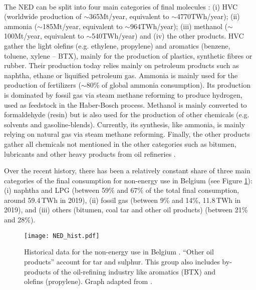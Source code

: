 \\

\noindent
The \gls{NED} can be split into four main categories of final molecules \cite{IEA2018_petrochemicals}: (i) \gls{HVC} (worldwide production of $\sim$365Mt/year, equivalent to $\sim$4770TWh/year); (ii) ammonia ($\sim$185Mt/year, equivalent to $\sim$964TWh/year); (iii) methanol ($\sim$100Mt/year, equivalent to $\sim$540TWh/year) and (iv) the other products. \Gls{HVC} gather the light olefins (e.g. ethylene, propylene) and aromatics (benzene, toluene, xylene – BTX), mainly for the production of plastics, synthetic fibres or rubber. Their production today relies mainly on petroleum products such as naphtha, ethane or liquified petroleum gas. Ammonia is  mainly used for the production of fertilizers ($\sim$80\% of global ammonia consumption). Its production is dominated by fossil gas via steam methane reforming to produce hydrogen, used as feedstock in the Haber-Bosch process. Methanol is mainly converted to formaldehyde (resin) but is also used for the production of other chemicals (e.g. solvents and gasoline-blends). Currently, its synthesis, like ammonia, is mainly relying on natural gas via steam methane reforming. Finally, the other products gather all chemicals not mentioned in the other categories such as bitumen, lubricants and other heavy products from oil refineries \cite{daioglou2014energy}.

Over the recent history, there has been a relatively constant share of three main categories of the final consumption for non-energy use in Belgium \cite{statbel_NED_2019} (see Figure \ref{fig:cs_NED_hist}): (i) naphtha and \gls{LPG} (between 59\% and 67\% of the total final consumption, around 59.4\,TWh in 2019), (ii) fossil gas (between 9\% and 14\%, 11.8\,TWh in 2019), and (iii) others (\ie bitumen, coal tar and other oil products) (between 21\% and 28\%). 

\begin{figure}[htbp!]
\centering
\texttt{[image: NED\_hist.pdf]}
\caption{Historical data for the non-energy use in Belgium \cite{statbel_NED_2019}. ``Other oil products'' account for tar and sulphur. This group also includes by-products of the oil-refining industry like aromatics (\eg \acrfull{BTX}) and olefins (\eg propylene). Graph adapted from \cite{rixhon2021comprehensive}.}
\label{fig:cs_NED_hist}
\end{figure}

